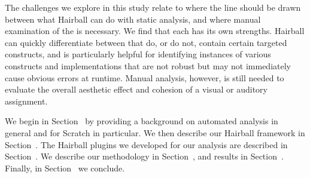 The challenges we explore in this study relate to where the line should be
drawn between what Hairball can do with static analysis, and where manual
examination of the \sprogram{} is necessary.  We find that each has its own
strengths.  Hairball can quickly differentiate between  that do, or
do not, contain certain targeted constructs, and is particularly helpful for
identifying instances of various constructs and implementations that are not
robust but may not immediately cause obvious errors at runtime.  Manual
analysis, however, is still needed to evaluate the overall aesthetic effect and
cohesion of a visual or auditory assignment.

We begin in Section~ by providing a background on
automated analysis in general and for Scratch in particular. We then describe
our Hairball framework in Section~. The Hairball
plugins we developed for our analysis are described in
Section~. We describe our methodology in
Section~, and results in
Section~. Finally, in Section~ we
conclude.
